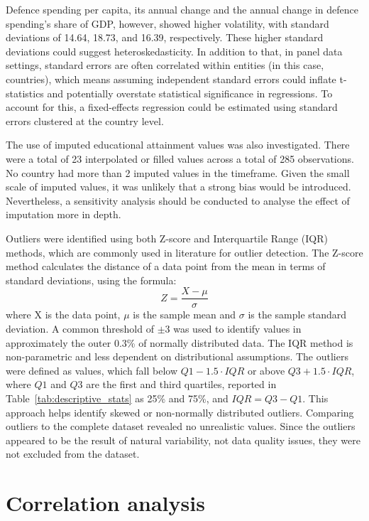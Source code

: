 Defence spending per capita, its annual change and the annual change in defence spending's share of GDP, however, showed higher volatility, with standard deviations of 14.64, 18.73, and 16.39, respectively. 
These higher standard deviations could suggest heteroskedasticity. 
In addition to that, in panel data settings, standard errors are often correlated within entities (in this case, countries), which means assuming independent standard errors could inflate t-statistics and potentially overstate statistical significance in regressions. 
To account for this, a fixed-effects regression could be estimated using standard errors clustered at the country level.

The use of imputed educational attainment values was also investigated. 
There were a total of 23 interpolated or filled values across a total of 285 observations. 
No country had more than 2 imputed values in the timeframe. 
Given the small scale of imputed values, it was unlikely that a strong bias would be introduced. Nevertheless, a sensitivity analysis should be conducted to analyse the effect of imputation more in depth.

Outliers were identified using both Z-score and Interquartile Range (IQR) methods, which are commonly used in literature for outlier detection. 
The Z-score method calculates the distance of a data point from the mean in terms of standard deviations, using the formula:
\begin{equation*}
    Z = \frac{X - \mu}{\sigma}
\end{equation*}
where X is the data point, $\mu$ is the sample mean and $\sigma$ is the sample standard deviation.
A common threshold of $\pm 3$ was used to identify values in approximately the outer 0.3\% of normally distributed data.
The IQR method is non-parametric and less dependent on distributional assumptions. 
The outliers were defined as values, which fall below $Q1 - 1.5 \cdot IQR$ or above $Q3 + 1.5 \cdot IQR$, where $Q1$ and $Q3$ are the first and third quartiles, reported in Table~\ref{tab:descriptive_stats} as 25\% and 75\%, and $IQR = Q3 - Q1$. 
This approach helps identify skewed or non-normally distributed outliers.
Comparing outliers to the complete dataset revealed no unrealistic values. 
Since the outliers appeared to be the result of natural variability, not data quality issues, they were not excluded from the dataset. \parencite{barnett_outliers_1994}

\section{Correlation analysis}

